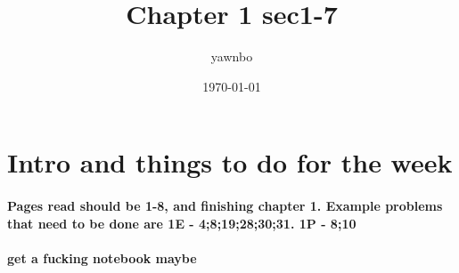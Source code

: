 \documentclass[a4paper]{article}
\title{Chapter 1 sec1-7}
\author{yawnbo}
\date{\today}
\begin{document}
\section{Intro and things to do for the week}%
\label{sec:Intro and things to do for the week}
\paragraph{Pages read should be 1-8, and finishing chapter 1. Example problems that need to be done are 1E - 4;8;19;28;30;31. 1P - 8;10}
\paragraph{get a fucking notebook maybe}
\end{document}
